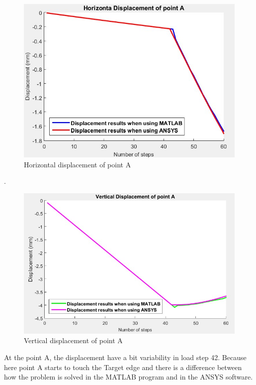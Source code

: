 \begin{figure}[H]
    \centering
    \includegraphics[scale=0.72]{Figures/xA_displace_self_q8_matlab.jpg}
    \decoRule
    \caption{Horizontal displacement of point A}
    \label{fig:xA_displace_self_q8_matlab}
\end{figure} \noindent.
\begin{figure}[H]
    \centering
    \includegraphics[scale=0.6]{Figures/yA_displace_self_q8_matlab.jpg}
    \decoRule
    \caption{Vertical displacement of point A}
    \label{fig:yA_displace_self_q8_matlab}
\end{figure} \noindent
At the point A, the displacement have a bit variability in load step 42.
Because here point A starts to touch the Target edge and 
there is a difference between how the problem is solved in the MATLAB program 
and in the ANSYS software.
